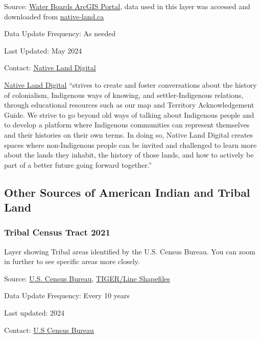 \documentclass[
  letterpaper,
  DIV=11,
  numbers=noendperiod]{scrreprt}
\begin{document}
Source:
\href{https://gispublic.waterboards.ca.gov/portal/home/item.html?id=c21e3128ad4b4f68b041420c3f19c4c8}{Water
Boards ArcGIS Portal}, data used in this layer was accessed and
downloaded from \href{https://native-land.ca/}{native-land.ca}

Data Update Frequency: As needed

Last Updated: May 2024

Contact: \href{https://native-land.ca/contact}{Native Land Digital}

\href{https://native-land.ca/about/why-it-matters}{Native Land Digital}
``strives to create and foster conversations about the history of
colonialism, Indigenous ways of knowing, and settler-Indigenous
relations, through educational resources such as our map and Territory
Acknowledgement Guide. We strive to go beyond old ways of talking about
Indigenous people and to develop a platform where Indigenous communities
can represent themselves and their histories on their own terms. In
doing so, Native Land Digital creates spaces where non-Indigenous people
can be invited and challenged to learn more about the lands they
inhabit, the history of those lands, and how to actively be part of a
better future going forward together.''

\subsection{Other Sources of American Indian and Tribal
Land}\label{other-sources-of-american-indian-and-tribal-land}

\subsubsection{Tribal Census Tract 2021}\label{tribal-census-tract-2021}

Layer showing Tribal areas identified by the U.S. Census Bureau. You can
zoom in further to see specific areas more closely.

Source:
\href{https://www.census.gov/cgi-bin/geo/shapefiles/index.php?year=2024&layergroup=American+Indian+Area+Geography}{U.S.
Census Bureau},
\href{https://www.census.gov/geographies/mapping-files/time-series/geo/tiger-line-file.html}{TIGER/Line
Shapefiles}

Data Update Frequency: Every 10 years

Last updated: 2024

Contact: \href{https://www.census.gov/about/contact-us.html}{U.S Census
Bureau}
\end{document}
